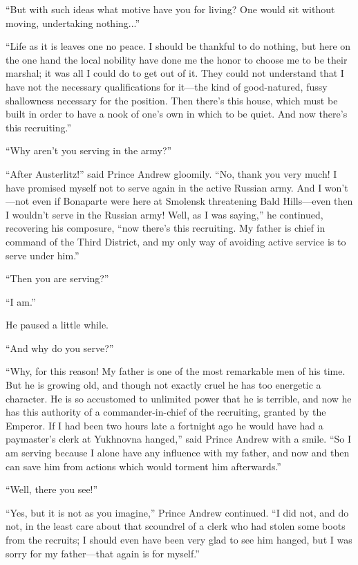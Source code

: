 ``But with such ideas what motive have you for living? One would
sit without moving, undertaking nothing...''

``Life as it is leaves one no peace. I should be thankful to do
nothing, but here on the one hand the local nobility have done me
the honor to choose me to be their marshal; it was all I could do
to get out of it.  They could not understand that I have not the
necessary qualifications for it---the kind of good-natured, fussy
shallowness necessary for the position. Then there's this house,
which must be built in order to have a nook of one's own in which
to be quiet. And now there's this recruiting.''

``Why aren't you serving in the army?''

``After Austerlitz!'' said Prince Andrew gloomily. ``No, thank
you very much! I have promised myself not to serve again in the
active Russian army. And I won't---not even if Bonaparte were
here at Smolensk threatening Bald Hills---even then I wouldn't
serve in the Russian army!  Well, as I was saying,'' he
continued, recovering his composure, ``now there's this
recruiting. My father is chief in command of the Third District,
and my only way of avoiding active service is to serve under
him.''

``Then you are serving?''

``I am.''

He paused a little while.

``And why do you serve?''

``Why, for this reason! My father is one of the most remarkable
men of his time. But he is growing old, and though not exactly
cruel he has too energetic a character. He is so accustomed to
unlimited power that he is terrible, and now he has this
authority of a commander-in-chief of the recruiting, granted by
the Emperor. If I had been two hours late a fortnight ago he
would have had a paymaster's clerk at Yukhnovna hanged,'' said
Prince Andrew with a smile. ``So I am serving because I alone
have any influence with my father, and now and then can save him
from actions which would torment him afterwards.''

``Well, there you see!''

``Yes, but it is not as you imagine,'' Prince Andrew
continued. ``I did not, and do not, in the least care about that
scoundrel of a clerk who had stolen some boots from the recruits;
I should even have been very glad to see him hanged, but I was
sorry for my father---that again is for myself.''

